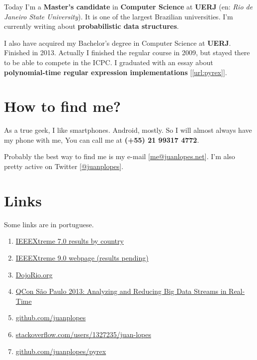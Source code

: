 \documentclass[a4paper,12pt,oneside]{article}
\begin{document}
	Today I'm a \textbf{Master's candidate} in \textbf{Computer Science} at
	\textbf{UERJ} (en: \emph{Rio de Janeiro State University}). It is one of the
	largest Brazilian universities. I'm currently writing about \textbf{probabilistic data structures}.

	I also have acquired my Bachelor's degree in Computer Science at \textbf{UERJ}.
	Finished in 2013. Actually I finished the regular course in 2009, but stayed
	there to be able to compete in the ICPC. I graduated with an essay about
	\textbf{polynomial-time regular expression implementations} [\ref{url:pyrex}].

\section*{How to find me?}

	As a true geek, I like smartphones. Android, mostly. So I will almost always
	have my phone with me, You can call me at \textbf{(+55) 21 99317 4772}.

	Probably the best way to find me is my e-mail
	[\href{mailto:me@juanlopes.net}{me@juanlopes.net}]. I'm also pretty active on
	Twitter [\href{http://twitter.com/juanplopes}{@juanplopes}].

\section*{Links}

	Some links are in portuguese.

\begin{enumerate}

  \item \label{url:ieeextreme7} \href{http://www.ieee.org/membership_services/membership/students/competitions/xtreme/xtreme7_final_rankings-country.pdf}{IEEEXtreme 7.0 results by country}
  
  \item \label{url:ieeextreme9} \href{http://www.ieee.org/xtreme}{IEEEXtreme 9.0 webpage (results pending)}
  
  \item \label{url:dojorio} \href{http://dojorio.org/}{DojoRio.org}
  \item \label{url:qconsp2013} \href{http://www.infoq.com/br/presentations/analisando-fluxo-dados-tempo-real}{QCon São Paulo 2013: Analyzing and Reducing Big Data Streams in Real-Time}
  \item \label{url:github} \href{https://github.com/juanplopes}{github.com/juanplopes}
  \item \label{url:stackoverflow} \href{http://stackoverflow.com/users/1327235/juan-lopes}{stackoverflow.com/users/1327235/juan-lopes}

  \item \label{url:pyrex} \href{http://github.com/juanplopes/pyrex}{github.com/juanplopes/pyrex}
  
  
\end{enumerate}
\end{document}
